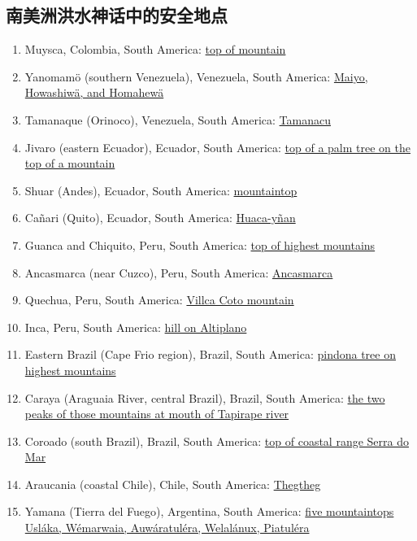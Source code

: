 \documentclass[10pt,twocolumn,letterpaper]{article}
\begin{document}
\subsection{南美洲洪水神话中的安全地点}

\begin{flushleft}
\begin{enumerate}
\item Muysca, Colombia, South America: \href{http://www.talkorigins.org/faqs/flood-myths.html#Muysca}{top of mountain}
\item Yanomamö (southern Venezuela), Venezuela, South America: \href{http://www.talkorigins.org/faqs/flood-myths.html#Yanomamo}{Maiyo, Howashiwä, and Homahewä}
\item Tamanaque (Orinoco), Venezuela, South America: \href{http://www.talkorigins.org/faqs/flood-myths.html#Tamanaque}{Tamanacu}
\item Jivaro (eastern Ecuador), Ecuador, South America: \href{http://www.talkorigins.org/faqs/flood-myths.html#Jivaro}{top of a palm tree on the top of a mountain}
\item Shuar (Andes), Ecuador, South America: \href{http://www.talkorigins.org/faqs/flood-myths.html#Shuar}{mountaintop}
\item Cañari (Quito), Ecuador, South America: \href{http://www.talkorigins.org/faqs/flood-myths.html#Canari}{Huaca-yñan}
\item Guanca and Chiquito, Peru, South America: \href{http://www.talkorigins.org/faqs/flood-myths.html#Guanca}{top of highest mountains}
\item Ancasmarca (near Cuzco), Peru, South America: \href{http://www.talkorigins.org/faqs/flood-myths.html#Ancasmarca}{Ancasmarca}
\item Quechua, Peru, South America: \href{http://www.talkorigins.org/faqs/flood-myths.html#Quechua}{Villca Coto mountain}
\item Inca, Peru, South America: \href{http://www.talkorigins.org/faqs/flood-myths.html#Inca}{hill on Altiplano}
\item Eastern Brazil (Cape Frio region), Brazil, South America: \href{http://www.talkorigins.org/faqs/flood-myths.html#CapeFrio}{pindona tree on highest mountains}
\item Caraya (Araguaia River, central Brazil), Brazil, South America: \href{http://www.talkorigins.org/faqs/flood-myths.html#Caraya}{the two peaks of those mountains at mouth of Tapirape river}
\item Coroado (south Brazil), Brazil, South America: \href{http://www.talkorigins.org/faqs/flood-myths.html#Coroado}{top of coastal range Serra do Mar}
\item Araucania (coastal Chile), Chile, South America: \href{http://www.talkorigins.org/faqs/flood-myths.html#Araucania}{Thegtheg}
\item Yamana (Tierra del Fuego), Argentina, South America: \href{http://www.talkorigins.org/faqs/flood-myths.html#Yamana}{five mountaintops Usláka, Wémarwaia, Auwáratuléra, Welalánux, Piatuléra}
\end{enumerate}
\end{flushleft}
\end{document}
